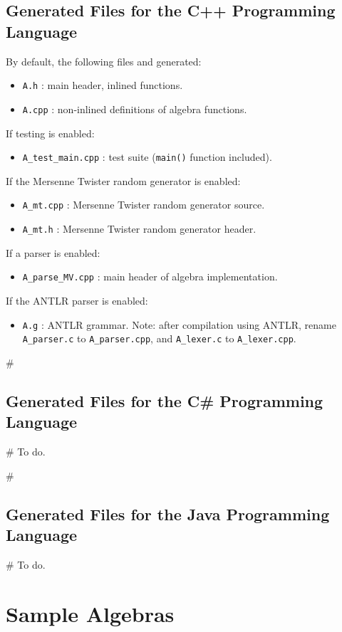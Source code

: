 \documentclass[10pt, a4paper]{article}
\begin{document}
\subsection{Generated Files for the C++ Programming Language}

By default, the following files and generated:
\begin{itemize}
\item {\tt A.h} : main header, inlined functions.
\item {\tt A.cpp} : non-inlined definitions of algebra functions.
\end{itemize}
If testing is enabled:
\begin{itemize}
\item {\tt A\_test\_main.cpp} : test suite ({\tt main()} function included).
\end{itemize}
If the Mersenne Twister random generator is enabled:
\begin{itemize}
\item {\tt A\_mt.cpp} : Mersenne Twister random generator source.
\item {\tt A\_mt.h} : Mersenne Twister random generator header.
\end{itemize}
If a parser is enabled:
\begin{itemize}
\item {\tt A\_parse\_MV.cpp} : main header of algebra implementation.
\end{itemize}
If the ANTLR parser is enabled:
\begin{itemize}
\item {\tt A.g} : ANTLR grammar. Note: after compilation using ANTLR, rename
{\tt A\_parser.c} to {\tt A\_parser.cpp}, and {\tt A\_lexer.c} to {\tt A\_lexer.cpp}.
\end{itemize}

# \subsection{Generated Files for the C\# Programming Language}

# To do.

# \subsection{Generated Files for the Java Programming Language}

# To do.

\section{Sample Algebras}
\label{s:sample_algebras}
\end{document}
